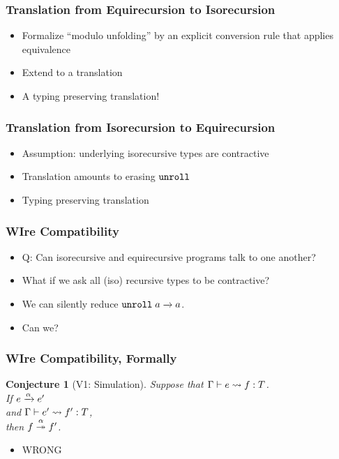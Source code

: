 \documentclass[aspectratio=169]{beamer}
\newtheorem{conjecture}{Conjecture}
\begin{document}
\begin{frame}
  \frametitle{Translation from Equirecursion to Isorecursion}
  \begin{itemize}
  \item<+-> Formalize ``modulo unfolding'' by an explicit conversion
    rule that applies equivalence
    \begin{mathpar}
\end{mathpar}
\item<+-> Extend to a translation
  \begin{mathpar}
\end{mathpar}
\item<+-> A typing preserving translation!

  \end{itemize}
\end{frame}
\begin{frame}
  \frametitle{Translation from Isorecursion to Equirecursion}
  \begin{itemize}
  \item<+-> Assumption: underlying isorecursive types are contractive
  \item<+-> Translation amounts to erasing $\EkwUnroll$
  \item<+-> Typing preserving translation
  \end{itemize}
\end{frame}
\begin{frame}
  \frametitle{WIre Compatibility}
  \begin{itemize}
  \item<+-> Q: Can isorecursive and equirecursive programs talk to one
    another?
  \item<+-> What if we ask all (iso) recursive types to be
    contractive?
  \item<+-> We can silently reduce $\reduce{\EUnroll a}{a}$.
  \item<+-> Can we?
  \end{itemize}
\end{frame}
\begin{frame}
  \frametitle{WIre Compatibility, Formally}
\begin{conjecture}[V1: Simulation]
  Suppose that $\translation {e}{f}T$. \\
  If $\reduce[\alpha]{e}{e'}$ \\
  and $\translation{e'}{f'}T$, \\
  then  $\reducemany[\alpha]{f}{f'}$.
\end{conjecture}
\begin{itemize}
\item<2-> WRONG
\end{itemize}
\end{frame}
\end{document}
